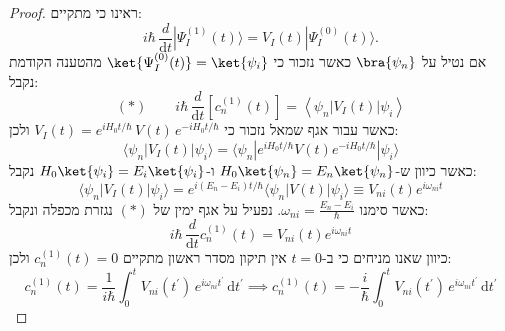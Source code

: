 \documentclass{tstextbook}
\begin{document}
\begin{proof}
ראינו כי מתקיים:
$$i\hbar\,\frac{d}{\mathrm{d} t}|\Psi_{I}^{(1)}(t)\rangle=V_{I}(t)|\Psi_{I}^{(0)}(t)\rangle.$$
אם נטיל על \(\bra{\psi_{n}}\) כאשר נזכור כי \(\ket{\Psi_{I}^{(0)}(t)}=\ket{\psi_{i}}\) מהטענה הקודמת נקבל:
$$(*)\qquad i\hbar\,\frac{d}{\mathrm{d} t}\left[c_{n}^{(1)}(t)\right]=\left\langle \psi_{n}|V_{I}(t)|\psi_{i} \right\rangle$$
כאשר עבור אגף שמאל נזכור כי \(V_{I}(t)=e^{i H_{0}t/\hbar}\,V(t)\,e^{-i H_{0}t/\hbar}\) ולכן:
$$\langle\psi_{n}|V_{I}(t)|\psi_{i}\rangle=\langle\psi_{n}|e^{i H_{0}t/\hbar}V(t)e^{-i H_{0}t/\hbar}|\psi_{i}\rangle$$
כאשר כיוון ש-\(H_{0}\ket{\psi_{n}}=E_{n}\ket{\psi_{n}}\) ו-\(H_{0}\ket{\psi_{i}}=E_{i}\ket{\psi_{i}}\) נקבל:
$$\langle\psi_{n}|V_{I}(t)|\psi_{i}\rangle=e^{i(E_{n}-E_{i})t/\hbar}\langle\psi_{n}|V(t)|\psi_{i}\rangle\equiv V_{n i}(t)e^{i\omega_{n i}t}$$
כאשר סימנו \(\omega_{ni}=\frac{E_{n}-E_{i}}{\hbar}\). נפעיל על אגף ימין של \((*)\) נגזרת מכפלה ונקבל:
$$i\hbar\,\frac{d}{\mathrm{d} t}c_{n}^{(1)}(t)=V_{n i}(t)e^{i\omega_{n i}t}$$
כיוון שאנו מניחים כי ב-\(t=0\) אין תיקון מסדר ראשון מתקיים \(c_{n}^{(1)}(t)=0\) ולכן:
$$c_{n}^{(1)}(t)=\frac{1}{i\hbar}\int_{0}^{t}V_{n i}\left( t^{\prime} \right)\,e^{i\omega_{n i}t^{\prime}}\,\mathrm{d} t^{\prime}\implies c_{n}^{(1)}(t)=-\frac{i}{\hbar}\int_{0}^{t}V_{n i}\left( t^{\prime} \right)\,e^{i\omega_{n i}t^{\prime}}\,\mathrm{d} t^{\prime}$$

\end{proof}
\end{document}
